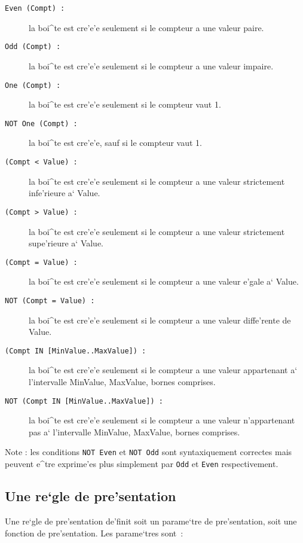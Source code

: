 {\begin{description}
\item[ {\tt Even (Compt) :} ]la boi^te est cre'e'e seulement si le compteur a
une valeur paire.
\item[ {\tt Odd (Compt) :} ]la boi^te est cre'e'e seulement si le compteur a
une valeur impaire.
\item[ {\tt One (Compt) :} ]la boi^te est cre'e'e seulement si le compteur
vaut 1.
\item[ {\tt NOT One (Compt) :} ]la boi^te est cre'e'e, sauf si le compteur
vaut 1.
\item[ {\tt (Compt < Value) :} ] la boi^te est cre'e'e seulement si le
compteur a une valeur strictement infe'rieure a` Value.
\item[ {\tt (Compt > Value) :} ] la boi^te est cre'e'e seulement si le
compteur a une valeur strictement supe'rieure a` Value.
\item[ {\tt (Compt = Value) :} ] la boi^te est cre'e'e seulement si le
compteur a une valeur e'gale a` Value.
\item[ {\tt NOT (Compt = Value) :} ] la boi^te est cre'e'e seulement si le
compteur a une valeur diffe'rente de Value.
\item[ {\tt (Compt IN [MinValue..MaxValue]) :} ] la boi^te est cre'e'e seulement si le
compteur a une valeur appartenant a` l'intervalle MinValue, MaxValue,
bornes comprises.
\item[ {\tt NOT (Compt IN [MinValue..MaxValue]) :} ] la boi^te est cre'e'e seulement si le
compteur a une valeur n'appartenant pas a` l'intervalle MinValue, MaxValue,
bornes comprises.
\end{description}

Note : les conditions {\tt NOT Even} et {\tt NOT Odd} sont syntaxiquement
correctes mais peuvent e^tre exprime'es plus simplement par {\tt Odd}
et {\tt Even} respectivement.

\subsection{Une re`gle de pre'sentation}
\label{reglepres}

Une re`gle de pre'sentation de'finit soit un parame`tre de pre'sentation,
soit une fonction de pre'sentation.
Les parame`tres sont~:

}
